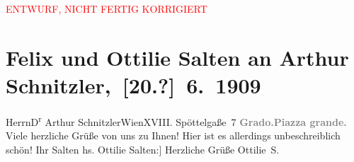 
\begin{center}
            \textcolor{red}{ENTWURF, NICHT FERTIG KORRIGIERT}
                      \end{center}
            
         
         \renewcommand{\erwaehntePersonen}{Personen: Felix Salten, Ottilie Salten}
         \renewcommand{\erwaehnteOrte}{Orte: Edmund-Weiß-Gasse 7, Grado, Piazza Duca D’Aosta, Wien}
         \renewcommand{\erwaehnteWerke}{}
               \section[ Felix und Ottilie Salten an Arthur Schnitzler, {[}20.?{]} 6. 1909]{ Felix und Ottilie Salten an Arthur Schnitzler, {[}20.?{]} 6. 1909}\nopagebreak{}\rehead{ }\begin{ledgroupsized}[t]{13cm}\normalsize\beginnumbering \toendnotes[C]{\smallbreak\pagebreak[2]} 
\toendnotes[C]{\smallbreak}\pstart{}{\pb}Herrn\pend{}\pstart{}D\textsuperscript{r} Arthur Schnitzler\pend{}\pstart{}Wien\pend{}\pstart{}XVIII. Spöttelgaße 7\pend{}{\bigskip}\pstart
           \noindent{}{\pb}\textcolor{gray}{\textbf{Grado.\hspace*{5em}Piazza grande.}}\pend
           \pstart
           {\pb}Viele herzliche Grüße von uns
               zu Ihnen! Hier ist es
               allerdings unbeschreiblich schön!\pend
           \pstart Ihr \spacefill\mbox{Salten}\pend{}{\bigskip}\pstart
           \noindent{}{[}hs. Ottilie Salten:{]} Herzliche Grüße\pend
           \pstart \spacefill\mbox{Ottilie S.}\pend{}
         
         \endnumbering{}\end{ledgroupsized}  \newcommand{\dateiname}{L03499}\newcommand{\titel}{Felix und Ottilie Salten an Arthur Schnitzler, [20.?] 6. 1909}\newcommand{\editorInnen}{Martin Anton Müller und Laura Untner}
      
